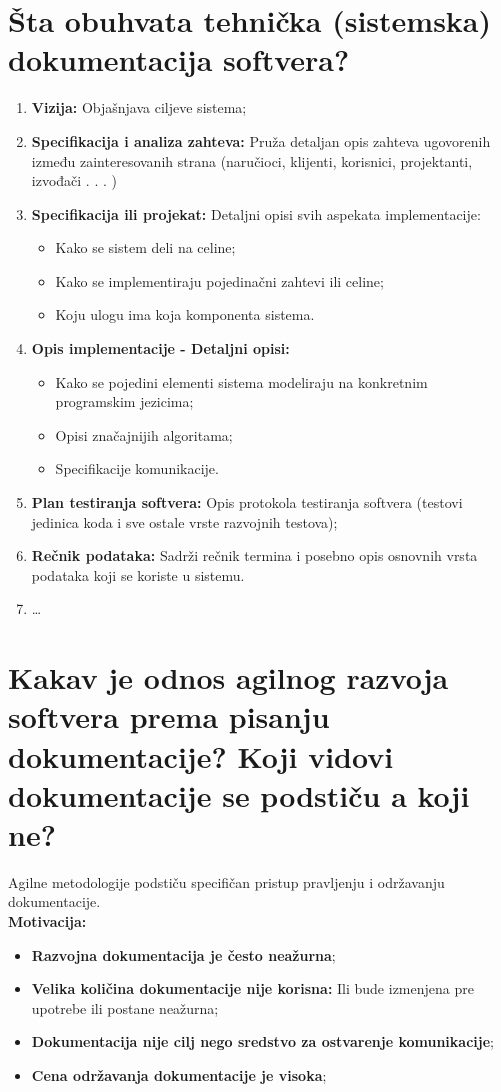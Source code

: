 \documentclass[a4paper]{article}
\begin{document}
\section{Šta obuhvata tehnička (sistemska) dokumentacija softvera?}
  \begin{enumerate}
    \item \textbf{Vizija:} Objašnjava ciljeve sistema;
    \item \textbf{Specifikacija i analiza zahteva:} Pruža detaljan opis zahteva ugovorenih 
          između zainteresovanih strana (naručioci, klijenti, korisnici, projektanti, izvođači . . . )
    \item \textbf{Specifikacija ili projekat:} Detaljni opisi svih aspekata implementacije:
      \begin{itemize}
        \item Kako se sistem deli na celine;
        \item Kako se implementiraju pojedinačni zahtevi ili celine;
        \item Koju ulogu ima koja komponenta sistema.
      \end{itemize}
  \item \textbf{Opis implementacije - Detaljni opisi:}
    \begin{itemize}
      \item Kako se pojedini elementi sistema modeliraju na konkretnim programskim jezicima;
      \item Opisi značajnijih algoritama;
      \item Specifikacije komunikacije.
    \end{itemize}
  \item \textbf{Plan testiranja softvera:} Opis protokola testiranja softvera (testovi jedinica koda 
        i sve ostale vrste razvojnih testova);
  \item \textbf{Rečnik podataka:} Sadrži rečnik termina i posebno opis osnovnih vrsta podataka 
        koji se koriste u sistemu.
  \item \dots
  \end{enumerate}
\section{Kakav je odnos agilnog razvoja softvera prema pisanju dokumentacije? 
         Koji vidovi dokumentacije se podstiču a koji ne?}
  Agilne metodologije podstiču specifičan pristup pravljenju i održavanju dokumentacije.\\
  \textbf{Motivacija:} 
  \begin{itemize}
    \item \textbf{Razvojna dokumentacija je često neažurna};
    \item \textbf{Velika količina dokumentacije nije korisna:} Ili bude izmenjena pre upotrebe 
          ili postane neažurna;
    \item \textbf{Dokumentacija nije cilj nego sredstvo za ostvarenje komunikacije};
    \item \textbf{Cena održavanja dokumentacije je visoka};
  \end{itemize}
\end{document}
